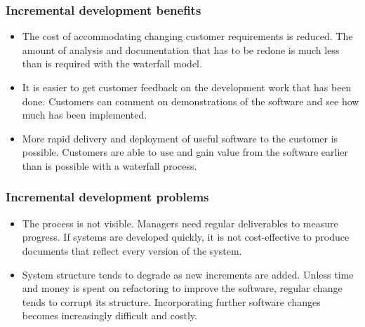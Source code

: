 \subsubsection{Incremental development benefits}
\begin{itemize}
  \item The cost of accommodating changing customer requirements is reduced.
  \newline The amount of analysis and documentation that has to be redone is much less than is required with the waterfall model.
  \item It is easier to get customer feedback on the development work that has been done.
  \newline Customers can comment on demonstrations of the software and see how much has been implemented.
  \item More rapid delivery and deployment of useful software to the customer is possible.
  \newline Customers are able to use and gain value from the software earlier than is possible with a waterfall process.
\end{itemize}

\subsubsection{Incremental development problems}
\begin{itemize}
  \item The process is not visible.
  \newline Managers need regular deliverables to measure progress. If systems are developed quickly, it is not cost-effective to produce documents that reflect every version of the system.

  \item System structure tends to degrade as new increments are added.
  \newline Unless time and money is spent on refactoring to improve the software, regular change tends to corrupt its structure. Incorporating further software changes becomes increasingly difficult and costly.
\end{itemize}


